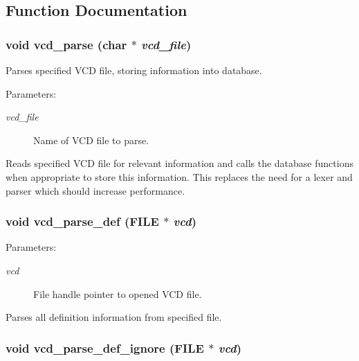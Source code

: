\subsection{Function Documentation}
\subsubsection{\setlength{\rightskip}{0pt plus 5cm}void vcd\_\-parse (char $\ast$ {\em vcd\_\-file})}\label{vcd_8c_a6}


Parses specified VCD file, storing information into database.

\begin{Desc}
\item[Parameters: ]\par
\begin{description}
\item[{\em 
vcd\_\-file}]Name of VCD file to parse.\end{description}
\end{Desc}
Reads specified VCD file for relevant information and calls the database functions when appropriate to store this information. This replaces the need for a lexer and parser which should increase performance. 
\subsubsection{\setlength{\rightskip}{0pt plus 5cm}void vcd\_\-parse\_\-def (FILE $\ast$ {\em vcd})}\label{vcd_8c_a3}


\begin{Desc}
\item[Parameters: ]\par
\begin{description}
\item[{\em 
vcd}]File handle pointer to opened VCD file.\end{description}
\end{Desc}
Parses all definition information from specified file. 
\subsubsection{\setlength{\rightskip}{0pt plus 5cm}void vcd\_\-parse\_\-def\_\-ignore (FILE $\ast$ {\em vcd})}\label{vcd_8c_a0}


